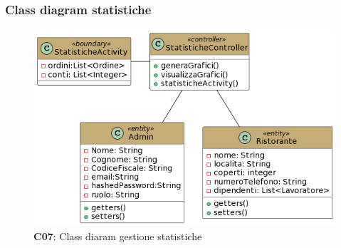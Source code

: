     \subsubsection{Class diagram statistiche}
        \begin{figure}[H]
            \centering
            \includegraphics[scale=0.5]{assets/diagrammi/Class diagram di analisi/Gestione Stat.png}
            \caption{\textbf{C07}: Class diaram gestione statistiche}\label{fig:Statistiche}
        \end{figure}